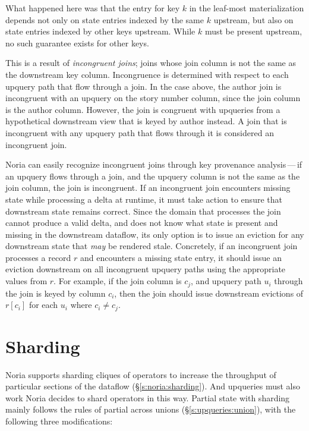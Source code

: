 What happened here was that the entry for key $k$ in the leaf-most
materialization depends not only on state entries indexed by the same $k$
upstream, but also on state entries indexed by other keys upstream. While $k$
must be present upstream, no such guarantee exists for other keys.

This is a result of \textit{incongruent joins}; joins whose join column is not
the same as the downstream key column. Incongruence is determined with respect
to each upquery path that flow through a join. In the case above, the author
join is incongruent with an upquery on the story number column, since the join
column is the author column. However, the join is congruent with upqueries from
a hypothetical downstream view that is keyed by author instead. A join that is
incongruent with any upquery path that flows through it is considered an
incongruent join.

Noria can easily recognize incongruent joins through key provenance
analysis\,---\,if an upquery flows through a join, and the upquery column is not
the same as the join column, the join is incongruent. If an incongruent join
encounters missing state while processing a delta at runtime, it must take
action to ensure that downstream state remains correct. Since the domain that
processes the join cannot produce a valid delta, and does not know what state is
present and missing in the downstream dataflow, its only option is to issue an
eviction for any downstream state that \emph{may} be rendered stale. Concretely,
if an incongruent join processes a record $r$ and encounters a missing state
entry, it should issue an eviction downstream on all incongruent upquery paths
using the appropriate values from $r$. For example, if the join column is $c_j$,
and upquery path $u_i$ through the join is keyed by column $c_i$, then the join
should issue downstream evictions of $r[c_i]$ for each $u_i$ where $c_i \neq
c_j$.

\section{Sharding}
\label{s:challenge:sharding}

Noria supports sharding cliques of operators to increase the throughput of
particular sections of the dataflow (\S\ref{s:noria:sharding}). And upqueries
must also work Noria decides to shard operators in this way. Partial state with
sharding mainly follows the rules of partial across unions
(\S\ref{s:upqueries:union}), with the following three modifications:

